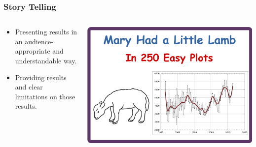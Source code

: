 \begin{frame}
\frametitle{Story Telling}

\begin{center}


\begin{columns}

\begin{column}{0.5\textwidth}
\begin{center}
\begin{itemize}
\item Presenting results in an audience-appropriate and understandable way.
\item Providing results and clear limitations on those results.
\end{itemize}
\end{center}
\end{column}

\begin{column}{0.5\textwidth}
\includegraphics[width=1.0\textwidth]{graphics/mary_had.pdf}
\end{column}

\end{columns}

\end{center}

\end{frame}


